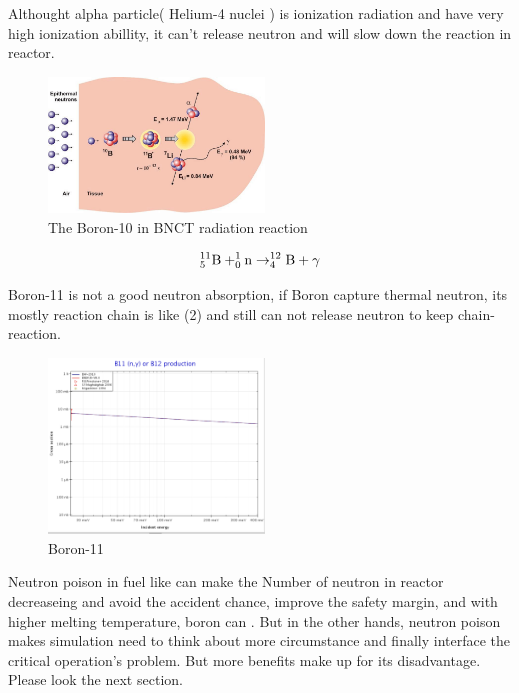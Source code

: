 \documentclass[final,10pt,times,twocolumn]{elsarticle}
\begin{document}
Althought alpha particle( Helium-4 nuclei ) is ionization radiation and have very high ionization abillity, it can't release neutron and will slow down the reaction in reactor.\\

\begin{figure}[ht]
    \centering
    \includegraphics[width = 5.75cm]{BNCT.png}
    \caption{The Boron-10 in BNCT radiation reaction\cite{Kasatov_2016} }
\end{figure}

\begin{equation}
    ^{11}_{5}\ce{B} + ^{1}_{0}\ce{n} \rightarrow ^{12}_{4}\ce{B} + \gamma
\end{equation}

Boron-11 is not a good neutron absorption, if Boron capture thermal neutron, its mostly reaction chain is like (2) and still can not release neutron to keep chain-reaction.

\begin{figure}[ht]
    \centering
    \includegraphics[width = 5.75cm]{Boron-11_Gamma.png}
    \caption{Boron-11 \cite{Kasatov_2016} }
\end{figure}

Neutron poison in fuel like  can make the Number of neutron in reactor decreaseing and avoid the accident chance, improve the safety margin, and with higher melting temperature, boron can . But in the other hands, neutron poison makes simulation need to think about more circumstance and finally interface the critical operation's problem. But  more benefits make up for its disadvantage. Please look the next section.
\end{document}
